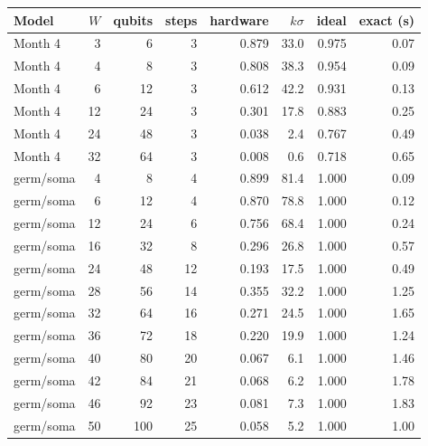 \begin{tabular}{lrrrrrrr}
\toprule
Model & $W$ & qubits & steps & hardware & $k\sigma$ & ideal & exact (s)\\
\midrule
Month 4 & 3 & 6 & 3 & 0.879 & 33.0 & 0.975 & 0.07\\
Month 4 & 4 & 8 & 3 & 0.808 & 38.3 & 0.954 & 0.09\\
Month 4 & 6 & 12 & 3 & 0.612 & 42.2 & 0.931 & 0.13\\
Month 4 & 12 & 24 & 3 & 0.301 & 17.8 & 0.883 & 0.25\\
Month 4 & 24 & 48 & 3 & 0.038 & 2.4 & 0.767 & 0.49\\
Month 4 & 32 & 64 & 3 & 0.008 & 0.6 & 0.718 & 0.65\\
\midrule
germ/soma & 4 & 8 & 4 & 0.899 & 81.4 & 1.000 & 0.09\\
germ/soma & 6 & 12 & 4 & 0.870 & 78.8 & 1.000 & 0.12\\
germ/soma & 12 & 24 & 6 & 0.756 & 68.4 & 1.000 & 0.24\\
germ/soma & 16 & 32 & 8 & 0.296 & 26.8 & 1.000 & 0.57\\
germ/soma & 24 & 48 & 12 & 0.193 & 17.5 & 1.000 & 0.49\\
germ/soma & 28 & 56 & 14 & 0.355 & 32.2 & 1.000 & 1.25\\
germ/soma & 32 & 64 & 16 & 0.271 & 24.5 & 1.000 & 1.65\\
germ/soma & 36 & 72 & 18 & 0.220 & 19.9 & 1.000 & 1.24\\
germ/soma & 40 & 80 & 20 & 0.067 & 6.1 & 1.000 & 1.46\\
germ/soma & 42 & 84 & 21 & 0.068 & 6.2 & 1.000 & 1.78\\
germ/soma & 46 & 92 & 23 & 0.081 & 7.3 & 1.000 & 1.83\\
germ/soma & 50 & 100 & 25 & 0.058 & 5.2 & 1.000 & 1.00\\
\bottomrule
\end{tabular}
